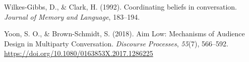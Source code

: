 \documentclass[10pt, letterpaper]{article}
\begin{document}
\begin{CSLReferences}{1}{0}
Wilkes-Gibbs, D., \& Clark, H. (1992). Coordinating beliefs in
conversation. \emph{Journal of Memory and Language}, 183--194.

Yoon, S. O., \& Brown-Schmidt, S. (2018). Aim {Low}: {Mechanisms} of
{Audience Design} in {Multiparty Conversation}. \emph{Discourse
Processes}, \emph{55}(7), 566--592.
\url{https://doi.org/10.1080/0163853X.2017.1286225}

\end{CSLReferences}


\end{document}
